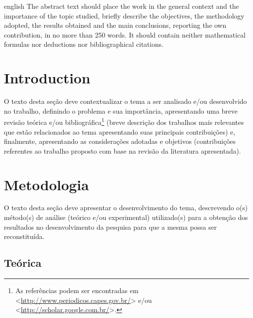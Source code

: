 \documentclass[%
  article,%
  10pt,%
  a4paper,%
  fleqn,%
  oneside,%
  sumario = tradicional,%
  chapter = TITLE,%
  section = TITLE,%
]{abntex2}
\author{
  21906085\\
  Duc Thang, NGUYEN\\
  \texttt{duc-thang.nguyen@univ-tlse3.fr}
  \and
   21902771\\
  Clement, POULL\\
  \texttt{clement.poull@univ-tlse3.fr}
}
\begin{document}
\pretextual%

\begin{paginadetitulo}%

\begin{ambienteresumo}[Abstract]%
\begin{otherlanguage*}{english}%
The abstract text should place the work in the general context and the importance of the topic studied, briefly describe the objectives, the methodology adopted, the results obtained and the main conclusions, reporting the own contribution, in no more than 250 words. It should contain neither mathematical formulas nor deductions nor bibliographical citations.
\end{otherlanguage*}
\end{ambienteresumo}

\end{paginadetitulo}

\textual%

\section{Introduction}\label{sec:intro}

O texto desta seção deve contextualizar o tema a ser analisado e/ou desenvolvido no trabalho, definindo o problema e sua importância, apresentando uma breve revisão teórica e/ou bibliográfica\footnote{As referências podem ser encontradas em <\url{http://www.periodicos.capes.gov.br/}> e/ou <\url{http://scholar.google.com.br/}>.} (breve descrição dos trabalhos mais relevantes que estão relacionados ao tema apresentando suas principais contribuições) e, finalmente, apresentando as considerações adotadas e objetivos (contribuições referentes ao trabalho proposto com base na revisão da literatura apresentada).

\section{Metodologia}\label{sec:met}

O texto desta seção deve apresentar o desenvolvimento do tema, descrevendo o(s) método(s) de análise (teórico e/ou experimental) utilizado(s) para a obtenção dos resultados no desenvolvimento da pesquisa para que a mesma possa ser reconstituída.

\subsection{Teórica}\label{ssec:teor}
\end{document}
